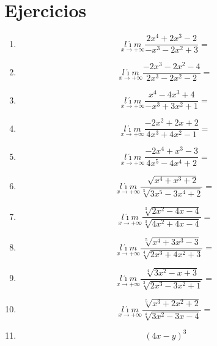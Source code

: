 \documentclass[oneside,spanish,letter]{article}
\begin{document}
\section{Ejercicios}
\begin{enumerate}
 \item $$\underset{x\rightarrow +\infty}{l\acute{\imath}m} \frac{2x^4+2x^3-2}{-x^3-2x^2+3}=$$
 \item $$\underset{x\rightarrow +\infty}{l\acute{\imath}m} \frac{-2x^3-2x^2-4}{2x^3-2x^2-2}=$$
 \item $$\underset{x\rightarrow +\infty}{l\acute{\imath}m} \frac{x^4-4x^3+4}{-x^3+3x^2+1}=$$
 \item $$\underset{x\rightarrow +\infty}{l\acute{\imath}m} \frac{-2x^2+2x+2}{4x^3+4x^2-1}=$$
 \item $$\underset{x\rightarrow +\infty}{l\acute{\imath}m} \frac{-2x^4+x^3-3}{4x^5-4x^4+2}=$$
 \item $$\underset{x\rightarrow +\infty}{l\acute{\imath}m} \frac{\sqrt[]{x^4+x^3+2}}{\sqrt[5]{3x^5-3x^4+2}}=$$
 \item $$\underset{x\rightarrow +\infty}{l\acute{\imath}m} \frac{\sqrt[3]{2x^2-4x-4}}{\sqrt[3]{4x^2+4x-4}}=$$
 \item $$\underset{x\rightarrow +\infty}{l\acute{\imath}m} \frac{\sqrt[5]{x^4+3x^3-3}}{\sqrt[4]{2x^3+4x^2+3}}=$$
 \item $$\underset{x\rightarrow +\infty}{l\acute{\imath}m} \frac{\sqrt[4]{3x^2-x+3}}{\sqrt[3]{2x^3-3x^2+1}}=$$
 \item $$\underset{x\rightarrow +\infty}{l\acute{\imath}m} \frac{\sqrt[5]{x^3+2x^2+2}}{\sqrt[4]{3x^2-3x-4}}=$$
\item $$(4x-y)^3$$
 \end{enumerate}
  \newpage
\end{document}
